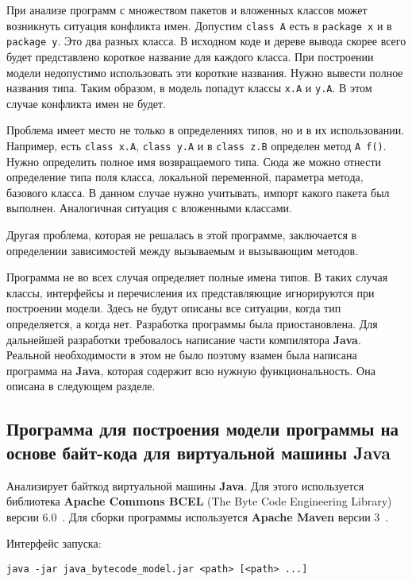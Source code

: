 При анализе программ с множеством пакетов и вложенных классов может возникнуть
ситуация конфликта имен.
Допустим \verb;class A; есть в \verb;package x; и в \verb;package y;.
Это два разных класса.
В исходном коде и дереве вывода скорее всего будет представлено короткое название
для каждого класса.
При построении модели недопустимо использовать эти короткие названия.
Нужно вывести полное названия типа.
Таким образом, в модель попадут классы \verb;x.A; и \verb;y.A;.
В этом случае конфликта имен не будет.

Проблема имеет место не только в определениях типов, но и в их использовании.
Например, есть \verb;class x.A;, \verb;class y.A; и в \verb;class z.B; определен
метод \verb;A f();.
Нужно определить полное имя возвращаемого типа.
Сюда же можно отнести определение типа поля класса, локальной переменной,
параметра метода, базового класса.
В данном случае нужно учитывать, импорт какого пакета был выполнен.
Аналогичная ситуация с вложенными классами.

Другая проблема, которая не решалась в этой программе, заключается в определении
зависимостей между вызываемым и вызывающим методов.

Программа не во всех случая определяет полные имена типов.
В таких случая классы, интерфейсы и перечисления их представляющие игнорируются
при построении модели.
Здесь не будут описаны все ситуации, когда тип определяется, а когда нет.
Разработка программы была приостановлена.
Для дальнейшей разработки требовалось написание части компилятора \textbf{Java}.
Реальной необходимости в этом не было
поэтому взамен была написана программа на \textbf{Java},
которая содержит всю нужную функциональность.
Она описана в следующем разделе.

\subsection{Программа для построения модели программы на основе байт-кода для виртуальной машины Java}

Анализирует байткод виртуальной машины \textbf{Java}.
Для этого используется библиотека \textbf{Apache Commons BCEL}
(The Byte Code Engineering Library) версии 6.0~\cite{BCEL}.
Для сборки программы используется \textbf{Apache Maven} версии 3~\cite{Maven}.

Интерфейс запуска:
\begin{verbatim}
java -jar java_bytecode_model.jar <path> [<path> ...]
\end{verbatim}

